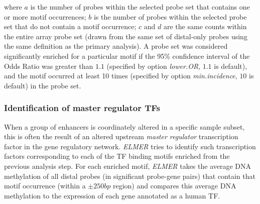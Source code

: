 where $a$ is the number of probes within the selected probe set that contains one 
or more motif occurrences; $b$ is the number of probes within the selected probe 
set that do not contain a motif occurrence; $c$ and $d$ are the same counts within 
the entire array probe set (drawn from the same set of distal-only probes using the same definition as the primary analysis). A probe set was considered significantly enriched 
for a particular motif if the 95\% confidence interval of the Odds Ratio was 
greater than $1.1$ (specified by option \textit{lower.OR}, $1.1$ is default), and the motif 
occurred at least 10 times (specified by option \textit{min.incidence}, $10$ is default) in 
the probe set. 


\subsubsection*{Identification of master regulator TFs}

When a group of enhancers is coordinately altered in a specific sample subset, this is often the result of an altered upstream \textit{master regulator} transcription factor in the gene regulatory network. \textit{ELMER} tries to identify such transcription factors corresponding to each of the TF binding motifs enriched from the previous analysis step.
For each enriched motif, \textit{ELMER} takes the average DNA methylation of all distal probes (in significant probe-gene pairs) that contain that motif occurrence (within a $\pm 250bp$ region) and compares this average DNA methylation to the expression of each gene annotated as a human TF.

